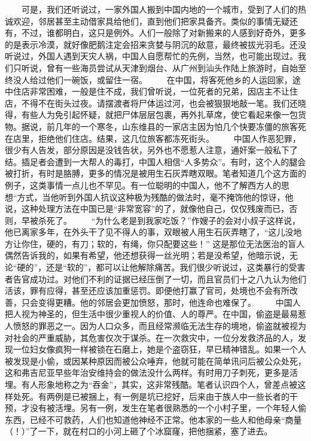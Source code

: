 \documentclass[12pt,oneside]{book}
\begin{document}
\begin{common-format}
　　可是，我们还听说过，一家外国人搬到中国内地的一个城市，受到了人们的热诚欢迎，邻居甚至主动借家具给他们，直到他们把家具备齐。类似的事情无疑还有，不过，谁都明白，这只是例外。人们一般除了对新搬来的人感到好奇外，更多的是表示冷漠，就好像肥鹅注定会招来贪婪与阴沉的敌意，最终被拔光羽毛。还没听说过，外国人遇到天灾人祸，中国人自愿帮忙的先例，当然，也可能出现过。我们只听说，曾有一些海员尝试从天津到烟台、从广州到汕头作陆上旅游时，自始至终没人给过他们一碗饭，或留住一宿。 
　　在中国，将客死他乡的人运回家，途中住店非常困难，一般是住不成，我们曾听说，一位死者的兄弟，因店主不让住店，不得不在街头过夜。请摆渡者将尸体运过河，也会被狠狠地敲一笔。我们还晓得，有些人为免引起怀疑，就把尸体层层包裹，再外扎草席，使它看起来像一包货物。据说，前几年的一个寒冬，山东维县的一家店主因为怕几个快要冻僵的旅客死在店里，拒绝他们住店。结果，这几位旅客都冻死街头。 
　　中国人作恶犯罪，很少有人告发，部分原因是没钱告状，另外也不愿惹人注意，通奸案一般私下了结。插足者会遭到一大帮人的毒打，中国人相信“人多势众”。有时，这个人的腿会被打折，有时是胳膊，更多的情况是被用生石灰弄瞎双眼。笔者知道几个这方面的例子，这类事情一点儿也不罕见。有一位聪明的中国人，他不了解西方人的思想“方式，当他听到外国人抗议这种极为残酷的做法时，毫不掩饰他的惊讶，他说，这种处理方法在中国已是“非常宽容”的了，就像他自己，仅仅残废而已，否则，早被杀死了。 
　　“为什么老是到我家吃饭？”作嫂子的会对小叔子这样说，他已离家多年，在外头干了见不得人的事，双眼被人用生石灰弄瞎了，“这儿没地方让你住，硬的，有刀；软的，有绳，你只配要这些！” 这是那位无法医治的盲人偶然告诉我的，如果有希望，他还想获得一丝光明；若是没希望，他暗示说，无论“硬的”，还是“软的”，都可以让他解除痛苦。我们很少听说过，这类暴行的受害者告官成功过。对他们不利的证据已经压倒了一切，而且官员们十之八九认为他们活该，罪有应得，甚至还应该加重惩罚。即便他打赢了官司，处境也不会有所改善，只会变得更糟。他的邻居会更加愤怒，那时，他连命也难保了。 
　　中国人把人视为神圣的，但生活中很少重视人的价值、人的尊严。在中国，偷盗是最易惹人愤怒的罪恶之一。因为人口众多，而且经常濒临无法生存的境地，偷盗就被视为对社会的严重威胁，其危害仅次于谋杀。在一次救灾中，一位分发救济品的人，发现一位妇女像疯狗一样被锁在石磨上，她是个盗窃狂，早已精神错乱。如果一个人被发现是小偷，或因某种原因而被公众唾弃，他就可能在简单讯问后被公众处死，这和弗吉尼亚早些年治安维持会的做法没什么两样。有时用刀子刺死，更多是活埋。有人形象地称之为“吞金”，其实，这非常残酷。笔者认识四个人，曾差点被这样处死。有两例是已被捆上，有一例是坑已挖好，后来由于族人中一些长者的干预，才没有被活埋。另有一例，发生在笔者很熟悉的一个小村子里，一个年轻人偷东西，已经不可救药，人们也知道他神经不正常。他本家的一些人和他母亲“商量（！）”了一下，就在村口的小河上砸了个冰窟窿，把他捆紧，塞了进去。 

\end{common-format}
\end{document}
